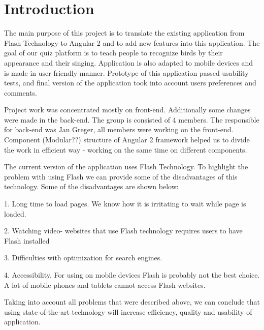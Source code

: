 
\chapter{Introduction}
\label{chap:introduction}
 
 
\par The main purpose of this project is to translate the existing application from Flash Technology to Angular 2 and to add new features into this application.
The goal of our quiz platform is to teach people to recognize birds by their appearance and their singing. Application is also adapted to mobile devices and is made in user friendly manner. Prototype of this application passed usability tests, and final version of the application took into account users preferences and comments.
\par
Project work was concentrated mostly on front-end. Additionally some changes were made in the back-end. The group is consisted of 4 members. The responsible for back-end  was Jan Greger, all members were working on the front-end. Component (Modular??) structure of Angular 2 framework helped us to divide the work in efficient way - working on the same time on different components. 
\par
The current version of the application uses Flash Technology. To highlight the problem with using Flash we can provide some of the disadvantages of this technology. \newline
Some of the disadvantages are shown below:
\par
1. Long time to load pages. We know how it is irritating to wait while page is loaded. 
\par
2. Watching video- websites that use Flash technology requires users to have Flash installed
\par
3. Difficulties with optimization for search engines. 
\par
4. Accessibility. For using on mobile devices Flash is probably not the best choice. A lot of mobile phones and tablets cannot access Flash websites.  \cite{Advan78:online}
\par
Taking into account all problems that were described above, we can conclude that using state-of-the-art technology will increase efficiency, quality and usability of application. 
